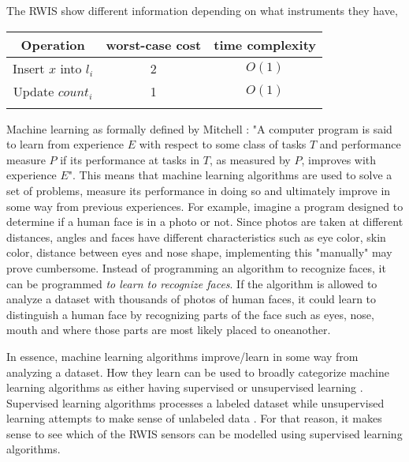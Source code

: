 	The RWIS show different information depending on what instruments they have, %

\begin{tabular}[3]{c | c | c}
    	Operation & worst-case cost & time complexity \\
    	\hline
    	Insert $x$ into $l_i$ & 2 & $O(1)$  \\
   	Update $count_i$ & 1 &$O(1)$ \\
	\label{table:rwis}
\end{tabular}


	Machine learning as formally defined by Mitchell \cite{BOOK:2}: 
"A computer program is said to learn from experience $E$ with respect to some class of tasks $T$ and performance measure $P$ if its performance at tasks in $T$, as measured by $P$, improves with experience $E$".	This means that machine learning algorithms are used to solve a set of problems, measure its performance in doing so and ultimately improve in some way from previous experiences. For example, imagine a program designed to determine if a human face is in a photo or not. Since photos are taken at different distances, angles and faces have different characteristics such as eye color, skin color, distance between eyes and nose shape, implementing this "manually" may prove cumbersome. Instead of programming an algorithm to recognize faces, it can be programmed  \emph{to learn to recognize faces}. If the algorithm is allowed to analyze a dataset with thousands of photos of human faces, it could learn to distinguish a human face by recognizing parts of the face such as eyes, nose, mouth and where those parts are most likely placed to oneanother.

	In essence, machine learning algorithms improve/learn in some way from analyzing a dataset. How they learn can be used to broadly categorize machine learning algorithms as either having supervised or unsupervised learning \cite{BOOK:1}. Supervised learning algorithms processes a labeled dataset while unsupervised learning attempts to make sense of unlabeled data \cite{BOOK:3}. For that reason, it makes sense to see which of the RWIS sensors can be modelled using supervised learning algorithms.


